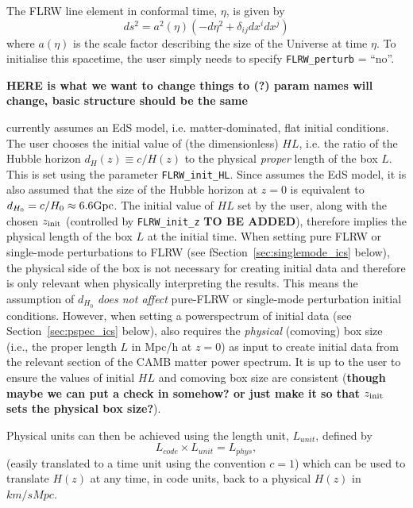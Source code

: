 The FLRW line element in conformal time, $\eta$, is given by
\begin{equation}
	ds^2 = a^2(\eta) \left( - d\eta^2 + \delta_{ij}dx^i dx^j \right)
\end{equation}
where $a(\eta)$ is the scale factor describing the size of the Universe at time $\eta$. To initialise this spacetime, the user simply needs to specify \texttt{FLRW\_perturb} = ``no''. 

\vspace{2mm}
{\bf HERE is what we want to change things to (?) param names will change, basic structure should be the same}
\vspace{2mm}

\flrwsolver currently assumes an EdS model, i.e. matter-dominated, flat initial conditions. The user chooses the initial value of (the dimensionless) $HL$, i.e. the ratio of the Hubble horizon $d_H(z)\equiv c/H(z)$ to the physical \emph{proper} length of the box $L$. This is set using the parameter \texttt{FLRW\_init\_HL}. Since \flrwsolver assumes the EdS model, it is also assumed that the size of the Hubble horizon at $z=0$ is equivalent to $d_{H_0}=c/H_0\approx 6.6{\rm Gpc}$. The initial value of $HL$ set by the user, along with the chosen $z_{\rm init}$ (controlled by \texttt{FLRW\_init\_z} {\bf TO BE ADDED}), therefore implies the physical length of the box $L$ at the initial time. When setting pure FLRW or single-mode perturbations to FLRW (see fSection~\ref{sec:singlemode_ics} below), the physical side of the box is not necessary for creating initial data and therefore is only relevant when physically interpreting the results. This means the assumption of $d_{H_0}$ \emph{does not affect} pure-FLRW or single-mode perturbation initial conditions. However, when setting a powerspectrum of initial data (see Section~\ref{sec:pspec_ics} below), \flrwsolver also requires the \emph{physical} (comoving) box size (i.e., the proper length $L$ in Mpc/h at $z=0$) as input to create initial data from the relevant section of the CAMB matter power spectrum. It is up to the user to ensure the values of initial $HL$ and comoving box size are consistent ({\bf though maybe we can put a check in somehow? or just make it so that $z_{\rm init}$ sets the physical box size?}).



Physical units can then be achieved using the length unit, $L_{unit}$, defined by
\begin{equation}
	L_{code} \times L_{unit} = L_{phys},
\end{equation}
(easily translated to a time unit using the convention $c=1$) which can be used to translate $H(z)$ at any time, in code units, back to a physical $H(z)$ in $km/s Mpc$. 


